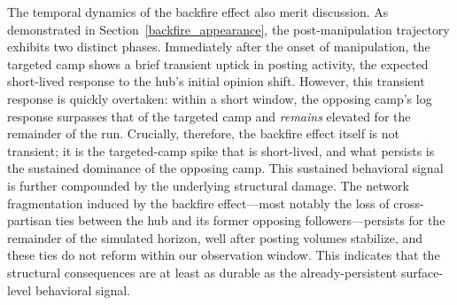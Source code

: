 \documentclass[pdflatex,sn-mathphys-num]{sn-jnl}%
\theoremstyle{thmstyleone}%
\theoremstyle{thmstyletwo}%
\theoremstyle{thmstylethree}%
\begin{document}
The temporal dynamics of the backfire effect
also merit discussion. As demonstrated in Section~\ref{backfire_appearance},
the post-manipulation trajectory exhibits two distinct phases.
Immediately after the onset of manipulation, the targeted camp shows a brief
transient uptick in posting activity, the expected short-lived
response to the hub's initial opinion shift. However,
this transient response is quickly overtaken: within a short window,
the opposing camp's log response surpasses that of
the targeted camp and \emph{remains} elevated for
the remainder of the run. Crucially, therefore,
the backfire effect itself is not transient; it is
the targeted-camp spike that is short-lived, and
what persists is the sustained dominance of the opposing camp.
This sustained behavioral signal is further compounded
by the underlying structural damage. The network
fragmentation induced by the backfire effect---most
notably the loss of cross-partisan
ties between the hub and its former opposing
followers---persists for the remainder of the simulated horizon,
well after posting volumes stabilize, and these ties do not reform
within our observation window. This indicates that the structural consequences
are at least as durable as the already-persistent surface-level behavioral signal.
\par
\end{document}
